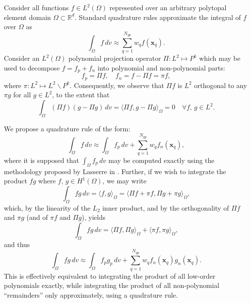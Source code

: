 	Consider all functions $f \in L^2 (\Omega)$ represented over an arbitrary polytopal element domain $\Omega \subset \mathbb{R}^d$. Standard quadrature rules approximate the integral of $f$ over $\Omega$ as
	\begin{equation}
		\int_\Omega f \, dv \approx \sum_{q=1}^{N_{qp}} w_q f(\mathbf{x}_q).
	\end{equation}
	Consider an $L^2 (\Omega)$ polynomial projection operator $\Pi : L^2 \mapsto P^k$ which may be used to decompose $f = f_p + f_n$ into polynomial and non-polynomial parts:
	\begin{equation}
		f_p = \Pi f, \quad f_n = f - \Pi f = \pi f,
	\end{equation}
	where $\pi : L^2 \mapsto L^2 \backslash P^k$. Consequently, we observe that $\Pi f$ is $L^2$ orthogonal to any $\pi g$ for all $g \in L^2$, to the extent that
	\begin{equation}
		\int_{\Omega} (\Pi f) (g - \Pi g) \, dv = \langle \Pi f, g - \Pi g \rangle_{\Omega} = 0 \quad \forall f, \, g \in L^2.
	\end{equation}
	
	We propose a quadrature rule of the form:
	\begin{equation}
		\int_\Omega f \, dv \approx \int_\Omega f_p \, dv + \sum_{q=1}^{N_{qp}} w_q f_n(\mathbf{x}_q),
	\end{equation}
	where it is supposed that $\int_\Omega f_p \, dv$ may be computed exactly using the methodology proposed by Lasserre in \cite{Chin:15}. Further, if we wish to integrate the product $f g$ where $f, \, g \in H^1 (\Omega)$, we may write
	\begin{equation}
		\int_\Omega f g \, dv = \langle f, g \rangle_{\Omega} = \langle \Pi f + \pi f, \Pi g + \pi  g \rangle_{\Omega},
	\end{equation}
	which, by the linearity of the $L_2$ inner product, and by the orthogonality of $\Pi f$ and $\pi g$ (and of $\pi f$ and $\Pi g$), yields
	\begin{equation}
		\int_\Omega f g \, dv = \langle \Pi f, \Pi g \rangle_{\Omega} + \langle \pi f, \pi g \rangle_{\Omega},
	\end{equation}
	and thus
	\begin{equation}
		\int_\Omega f g \, dv \approx \int_\Omega f_p g_p \, dv + \sum_{q=1}^{N_{qp}} w_q f_n(\mathbf{x}_q) g_n(\mathbf{x}_q).
	\end{equation}
	This is effectively equivalent to integrating the product of all low-order polynomials exactly, while integrating the product of all non-polynomial ``remainders'' only approximately, using a quadrature rule.
	
